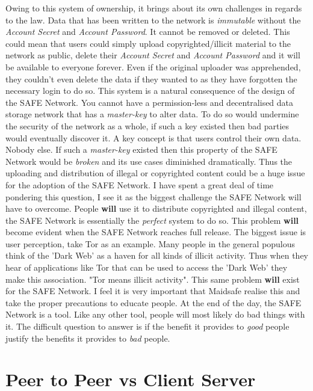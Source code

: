 \documentclass{l4proj}
\begin{document}
Owing to this system of ownership, it brings about its own challenges in regards to the law. Data that has been written to the network is \textit{immutable} without the \textit{Account Secret} and \textit{Account Password}. It cannot be removed or deleted. This could mean that users could simply upload copyrighted/illicit material to the network as public, delete their \textit{Account Secret} and \textit{Account Password} and it will be available to everyone forever. Even if the original uploader was apprehended, they couldn't even delete the data if they wanted to as they have forgotten the necessary login to do so. This system is a natural consequence of the design of the SAFE Network. You cannot have a permission-less and decentralised data storage network that has a \textit{master-key} to alter data. To do so would undermine the security of the network as a whole, if such a key existed then bad parties would eventually discover it. A key concept is that users control their own data. Nobody else. If such a \textit{master-key} existed then this property of the SAFE Network would be \textit{broken} and its use cases diminished dramatically. Thus the uploading and distribution of illegal or copyrighted content could be a huge issue for the adoption of the SAFE Network. I have spent a great deal of time pondering this question, I see it as the biggest challenge the SAFE Network will have to overcome. People \textbf{will} use it to distribute copyrighted and illegal content, the SAFE Network is essentially the \textit{perfect} system to do so. This problem \textbf{will} become evident when the SAFE Network reaches full release. The biggest issue is user perception, take Tor as an example. Many people in the general populous think of the 'Dark Web' as a haven for all kinds of illicit activity. Thus when they hear of applications like Tor that can be used to access the 'Dark Web' they make this association. "Tor means illicit activity". This same problem \textbf{will} exist for the SAFE Network. I feel it is very important that Maidsafe realise this and take the proper precautions to educate people. At the end of the day, the SAFE Network is a tool. Like any other tool, people will most likely do bad things with it. The difficult question to answer is if the benefit it provides to \textit{good} people justify the benefits it provides to \textit{bad} people.
 
\section{Peer to Peer vs Client Server}
\end{document}
